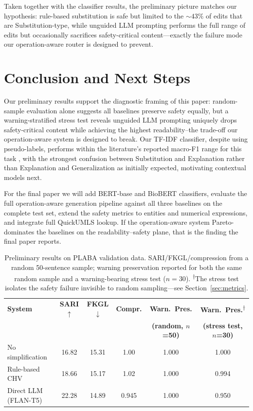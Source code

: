 \documentclass[11pt]{article}
\begin{document}
Taken together with the classifier results, the preliminary picture
matches our hypothesis: rule-based substitution is safe but limited to
the $\sim\!43\%$ of edits that are Substitution-type, while unguided LLM
prompting performs the full range of edits but occasionally sacrifices
safety-critical content---exactly the failure mode our operation-aware
router is designed to prevent.


\section{Conclusion and Next Steps}

Our preliminary results support the diagnostic framing of this paper:
random-sample evaluation alone suggests all baselines preserve safety
equally, but a warning-stratified stress test reveals unguided LLM
prompting uniquely drops safety-critical content while achieving the
highest readability--the trade-off our operation-aware system is
designed to break. Our TF-IDF classifier, despite using pseudo-labels,
performs within the literature's reported macro-F1 range for this task
\citep{ondov2025lessons}, with the strongest confusion between
Substitution and Explanation rather than Explanation and Generalization
as initially expected, motivating contextual models next.

For the final paper we will add BERT-base and BioBERT classifiers,
evaluate the full operation-aware generation pipeline against all three
baselines on the complete test set, extend the safety metrics to entities
and numerical expressions, and integrate full QuickUMLS lookup. If the
operation-aware system Pareto-dominates the baselines on the
readability--safety plane, that is the finding the final paper reports.

\begin{table}[t]
  \centering
  \small
  \begin{tabular}{lccccc}
    \toprule
    \textbf{System} & \textbf{SARI}$\uparrow$ & \textbf{FKGL}$\downarrow$ &
    \textbf{Compr.} & \textbf{Warn.\ Pres.} & \textbf{Warn.\ Pres.}\textsuperscript{$\dagger$} \\
     & & & & \textbf{(random, $n$=50)} & \textbf{(stress test, $n$=30)} \\
    \midrule
    No simplification    & 16.82 & 15.31 & 1.00  & 1.000 & 1.000 \\
    Rule-based CHV        & 18.66 & 15.17 & 1.02  & 1.000 & 0.994 \\
    Direct LLM (FLAN-T5)  & 22.28 & 14.89 & 0.945 & 1.000 & 0.950 \\
    \bottomrule
  \end{tabular}
  \caption{Preliminary results on PLABA validation data. SARI/FKGL/compression
    from a random 50-sentence sample; warning preservation reported for both
    the same random sample and a warning-bearing stress test ($n=30$).
    \textsuperscript{$\dagger$}The stress test isolates the safety failure
    invisible to random sampling---see Section~\ref{sec:metrics}.}
  \label{tab:prelim_results}
\end{table}
\end{document}
